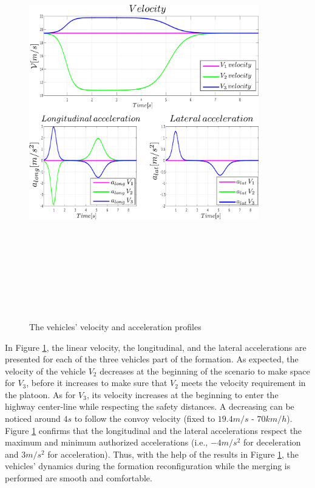 \begin{enumerate}
        \begin{figure}[!h]
        \centering 
        \includegraphics[width=10cm,height=18cm,keepaspectratio]{chapters/Chapitre_5/Figures/CORM/velocities.pdf}
        \caption{The vehicles' velocity and acceleration profiles}
        \label{fig:CORM: velocity}
        \end{figure}





In Figure \ref{fig:CORM: velocity}, the linear velocity, the longitudinal, and the lateral accelerations are presented for each of the three vehicles part of the formation. As expected, the velocity of the vehicle $V_2$ decreases at the beginning of the scenario to make space for $V_3$, before it increases to make sure that $V_2$ meets the velocity requirement in the platoon. As for $V_3$, its velocity increases at the beginning to enter the highway center-line while respecting the safety distances. A decreasing can be noticed around $4s$ to follow the convoy velocity (fixed to $19.4 m/s$ - $70 km/h$). Figure \ref{fig:CORM: velocity} confirms that the longitudinal and the lateral accelerations respect the maximum and minimum authorized accelerations (i.e., $-4m/s^2$ for deceleration and $3m/s^2$ for acceleration). Thus, with the help of the results in Figure \ref{fig:CORM: velocity}, the vehicles' dynamics during the formation reconfiguration while the merging is performed are smooth and comfortable. 





\end{enumerate}
